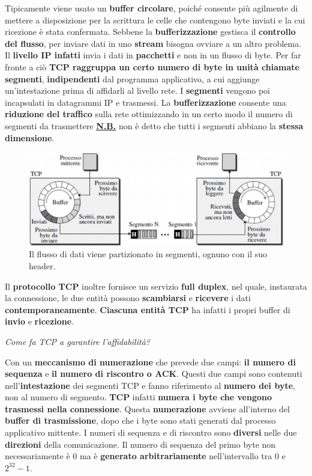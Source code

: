 \documentclass[11pt,a4paper]{article}
\theoremstyle{definition}
\begin{document}
Tipicamente viene usato un \textbf{buffer circolare}, poiché consente più agilmente di mettere a disposizione per la scrittura le celle che contengono byte inviati e la cui ricezione è stata confermata.
\newpage
Sebbene la \textbf{bufferizzazione} gestisca il \textbf{controllo del flusso}, per inviare dati in uno \textbf{stream} bisogna ovviare a un altro problema. Il \textbf{livello IP infatti} invia i dati in \textbf{pacchetti} e non in un flusso di byte. Per far fronte a ciò \textbf{TCP raggruppa un certo numero di byte in unità chiamate segmenti},  \textbf{indipendenti} dal programma applicativo, a cui aggiunge un'intestazione prima di affidarli al livello rete.
I \textbf{segmenti} vengono poi incapsulati in datagrammi IP e trasmessi. La \textbf{bufferizzazione} consente una \textbf{riduzione del traffico} sulla rete
ottimizzando in un certo modo il numero di segmenti da trasmettere\newline
\textbf{\underline{N.B.}} non è detto che tutti i segmenti abbiano la \textbf{stessa dimensione}.
\begin{figure}[!h]
	\includegraphics[scale=0.5]{Immagini/TCP_segm.png}
	\centering
	\caption{Il flusso di dati viene partizionato in segmenti, ognuno con il suo header.}
\end{figure}\newline
Il \textbf{protocollo TCP} inoltre fornisce un servizio \textbf{full duplex}, nel quale, instaurata la connessione, le due entità possono \textbf{scambiarsi} e \textbf{ricevere} i dati \textbf{contemporaneamente}. \textbf{Ciascuna entità TCP} ha infatti i propri buffer di \textbf{invio} e \textbf{ricezione}.
\begin{flushleft}
	\textit{Come fa TCP a garantire l'affidabilità?}
\end{flushleft}
Con un \textbf{meccanismo di numerazione} che prevede due campi: \textbf{il numero di sequenza} e \textbf{il numero di riscontro o ACK}. Questi due campi sono contenuti nell'\textbf{intestazione} dei segmenti TCP e fanno riferimento al \textbf{numero dei byte}, non al numero di segmento. \textbf{TCP} infatti \textbf{numera i byte che vengono trasmessi nella connessione}. Questa \textbf{numerazione} avviene all'interno del \textbf{buffer di trasmissione}, dopo che i byte sono stati generati dal processo applicativo mittente. I numeri di sequenza e di riscontro sono \textbf{diversi} nelle due \textbf{direzioni} della comunicazione. Il numero di sequenza del primo byte non necessariamente è 0 ma è \textbf{generato arbitrariamente} nell'intervallo tra 0 e $2^{32} - 1$.\newline
\end{document}
